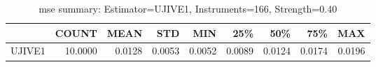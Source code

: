 \begin{table}[ht]
\centering
\caption{mse summary: Estimator=UJIVE1, Instruments=166, Strength=0.40}
\begin{tabular}{lrrrrrrrr}
\toprule
 & COUNT & MEAN & STD & MIN & 25\% & 50\% & 75\% & MAX \\
\midrule
UJIVE1 & 10.0000 & 0.0128 & 0.0053 & 0.0052 & 0.0089 & 0.0124 & 0.0174 & 0.0196 \\
\bottomrule
\end{tabular}
\end{table}
